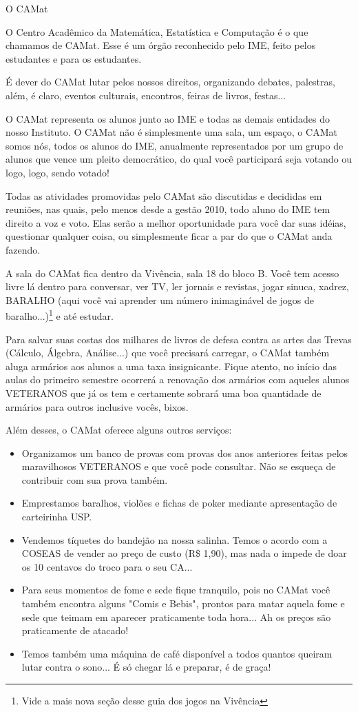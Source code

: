 \begin{secao}{O CAMat}

O Centro Acadêmico da Matemática, Estatística e Computação é o que chamamos de
CAMat. Esse é um órgão reconhecido pelo IME, feito pelos estudantes e para os
estudantes.

É dever do CAMat lutar pelos nossos direitos, organizando debates, palestras,
além, é claro, eventos culturais, encontros, feiras de livros, festas...

O CAMat representa os alunos junto ao IME e todas as demais entidades do nosso
Instituto. O CAMat não é simplesmente uma sala, um espaço, o CAMat somos nós,
todos os alunos do IME, anualmente representados por um grupo de alunos que
vence um pleito democrático, do qual você participará seja votando ou logo,
logo, sendo votado!

Todas as atividades promovidas pelo CAMat são discutidas e decididas em
reuniões, nas quais, pelo menos desde a gestão 2010, todo aluno do IME tem
direito a voz e voto. Elas serão a melhor oportunidade para você dar suas
idéias, questionar qualquer coisa, ou simplesmente ficar a par do que o CAMat
anda fazendo.

A sala do CAMat  fica dentro da Vivência, sala 18 do bloco B. Você tem acesso
livre lá dentro para conversar, ver TV, ler jornais e revistas, jogar sinuca,
xadrez, BARALHO (aqui você vai aprender um número inimaginável de jogos de
baralho...)\footnote{Vide a mais nova seção desse guia dos jogos na Vivência} e
até estudar.


Para salvar suas costas dos milhares de livros de defesa contra as artes das
Trevas (Cálculo, Álgebra, Análise...) que você precisará carregar, o CAMat
também aluga armários aos alunos a uma taxa insignicante. Fique atento, no
início das aulas do primeiro semestre ocorrerá a renovação dos armários com
aqueles alunos VETERANOS que já os tem e certamente sobrará uma boa quantidade
de armários para outros inclusive vocês, bixos.

Além desses, o CAMat oferece alguns outros serviços:

\begin{itemize}
\item Organizamos um banco de provas com provas dos anos anteriores feitas
pelos maravilhosos VETERANOS e que você pode consultar. Não se esqueça de
contribuir com sua prova também.
\item Emprestamos baralhos, violões e fichas de poker mediante apresentação de
carteirinha USP.
\item Vendemos tíquetes do bandejão na nossa salinha. Temos o acordo com a
COSEAS de vender ao preço de custo (R\$ 1,90), mas nada o impede de doar os 10
centavos do troco para o seu CA...
\item Para seus momentos de fome e sede fique tranquilo, pois no CAMat você
também encontra alguns "Comis e Bebis", prontos para matar aquela fome e sede
que teimam em aparecer praticamente toda hora... Ah os preços são praticamente
de atacado!
\item Temos também uma máquina de café disponível a todos quantos queiram lutar
contra o sono... É só chegar lá e preparar, é de graça!
\end{itemize}


\end{secao}
